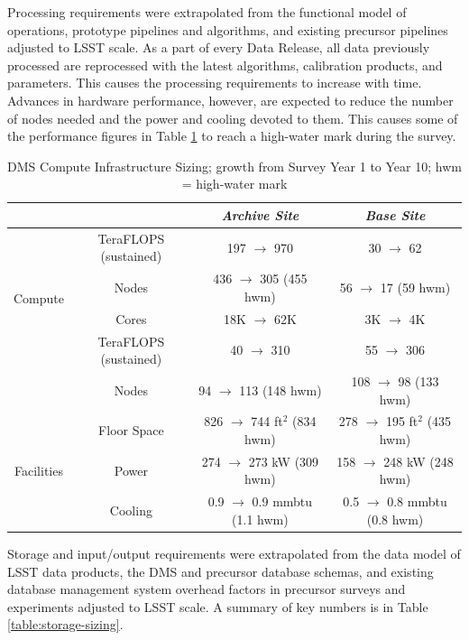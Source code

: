 Processing requirements were extrapolated from the functional model of
operations, prototype pipelines and algorithms, and existing precursor
pipelines adjusted to LSST scale.  As a part of every Data Release, all data
previously processed are reprocessed with the latest algorithms, calibration
products, and parameters. This causes the processing requirements to increase
with time.  Advances in hardware performance, however, are expected to reduce
the number of nodes needed and the power and cooling devoted to them. This causes some of the performance figures in Table \ref{table:compute-sizing} to reach
a high-water mark during the survey.

\begin{table}
\centering
\begin{longtable}{|c|c|c|c|}
\hline
	& & \textit{Archive Site} & \textit{Base Site} \\ \hline
\multirow{4}{*}{Compute} & TeraFLOPS (sustained) & 197 $\rightarrow$ 970 & 30 $\rightarrow$ 62 \\ \cline{2-4}
  & Nodes & 436 $\rightarrow$ 305 (455 hwm) & 56 $\rightarrow$ 17 (59 hwm) \\ \cline{2-4}
  & Cores & 18K $\rightarrow$ 62K & 3K $\rightarrow$ 4K \\ \hline
\multirow{2}{*}{Database} & TeraFLOPS (sustained) & 40 $\rightarrow$ 310 & 55 $\rightarrow$ 306 \\ \cline{2-4}
  & Nodes & 94 $\rightarrow$ 113 (148 hwm) & 108 $\rightarrow$ 98 (133 hwm) \\ \cline{2-4}
\multirow{3}{*}{Facilities} & Floor Space & 826 $\rightarrow$ 744 ft$^2$ (834 hwm) & 278 $\rightarrow$ 195 ft$^2$ (435 hwm) \\ \cline{2-4}
  & Power & 274 $\rightarrow$ 273 kW (309 hwm) & 158 $\rightarrow$ 248 kW (248 hwm) \\ \cline{2-4}
  & Cooling & 0.9 $\rightarrow$ 0.9 mmbtu (1.1 hwm) & 0.5 $\rightarrow$ 0.8 mmbtu (0.8 hwm) \\ \hline
\end{longtable}
\caption{DMS Compute Infrastructure Sizing; growth from Survey Year 1 to Year 10; hwm = high-water mark}
\label{table:compute-sizing}
\end{table}

Storage and input/output requirements were extrapolated from the data model of
LSST data products, the DMS and precursor database schemas, and
existing database management system overhead factors in precursor
surveys and experiments adjusted to LSST scale. A summary of key numbers is
in Table \ref{table:storage-sizing}.

